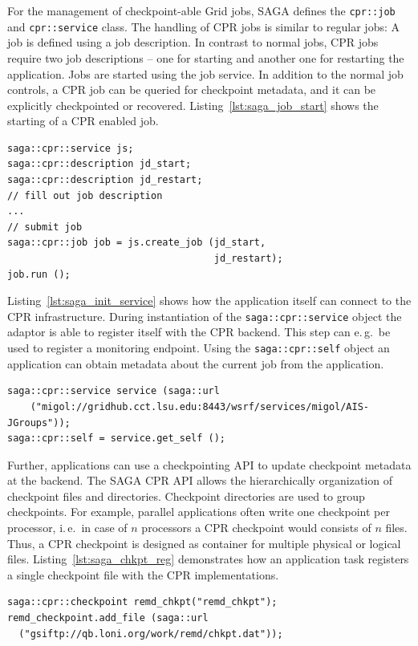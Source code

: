\documentclass[times, 10pt,twocolumn]{article}
\begin{document}
For the management of checkpoint-able Grid jobs, SAGA defines the \texttt{cpr::job} and \texttt{cpr::service} class. The handling of 
CPR jobs is similar to regular jobs: A job is defined using a job description. In contrast to normal jobs, 
CPR jobs require  two job descriptions -- one for starting and another one for restarting the application.
Jobs are started using the job service. In addition to the normal job controls, a CPR job can be queried for checkpoint metadata, and 
it can be explicitly checkpointed or recovered. Listing~\ref{lst:saga_job_start} shows the starting of a CPR enabled job.

\begin{lstlisting}[style=myListing, caption={SAGA CPR: Starting a Job}, float=t, label={lst:saga_job_start}]
saga::cpr::service js; 
saga::cpr::description jd_start;
saga::cpr::description jd_restart;
// fill out job description
...
// submit job  
saga::cpr::job job = js.create_job (jd_start, 
                                    jd_restart);
job.run ();
\end{lstlisting}

Listing~\ref{lst:saga_init_service} shows how the application itself can connect to the CPR infrastructure. During instantiation of the \texttt{saga::cpr::service} object the adaptor is able to register itself with the CPR backend. This step can e.\,g.\ be used to register a monitoring endpoint. Using the \texttt{saga::cpr::self} object an application can obtain metadata about the current job from the application.                                                                               
\begin{lstlisting}[style=myListing, caption={SAGA CPR: Initialize Migol Session}, float=t, label={lst:saga_init_service}]
saga::cpr::service service (saga::url 
    ("migol://gridhub.cct.lsu.edu:8443/wsrf/services/migol/AIS-JGroups"));
saga::cpr::self = service.get_self ();
\end{lstlisting}

Further, applications can use a checkpointing API to update checkpoint metadata at the backend. The SAGA CPR API allows the hierarchically 
organization of checkpoint files and directories. Checkpoint directories are 
used to group checkpoints. For example, parallel applications often write one checkpoint per 
processor, i.\,e.\ in case of $n$ processors a CPR checkpoint
would consists of $n$ files. Thus, a CPR checkpoint is designed as container 
for multiple physical or logical files. Listing~\ref{lst:saga_chkpt_reg} demonstrates 
how an application task registers a single checkpoint file with the CPR implementations.     
\begin{lstlisting}[style=myListing, caption={SAGA CPR: Register Checkpoint with Migol}, float=t, label={lst:saga_chkpt_reg}]
saga::cpr::checkpoint remd_chkpt("remd_chkpt");
remd_checkpoint.add_file (saga::url 
  ("gsiftp://qb.loni.org/work/remd/chkpt.dat"));
\end{lstlisting}
\end{document}
